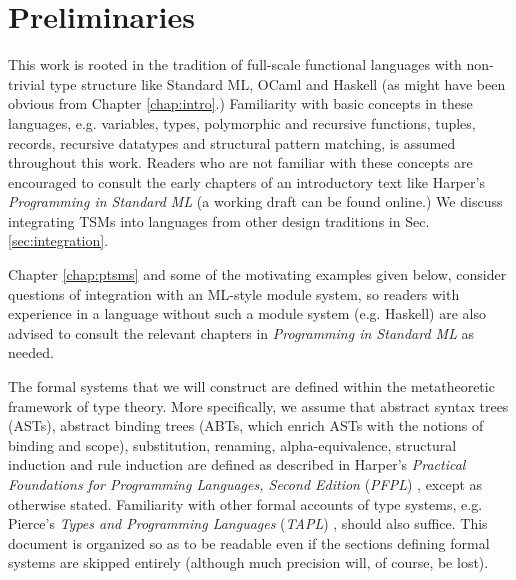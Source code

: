 
\section{Preliminaries}\label{sec:preliminaries}
This work is rooted in the tradition of full-scale functional languages with non-trivial type structure like Standard ML, OCaml and Haskell (as might have been obvious from Chapter \ref{chap:intro}.) Familiarity with basic concepts in these languages, e.g. variables, types, polymorphic and recursive functions, tuples, records, recursive datatypes and structural pattern matching, is assumed throughout this work. Readers who are not familiar with these concepts are encouraged to consult the early chapters of an introductory text like Harper's \emph{Programming in Standard ML} \cite{harper1997programming} (a working draft can be found online.) We discuss integrating TSMs into languages from other design traditions in Sec. \ref{sec:integration}.

Chapter \ref{chap:ptsms} and some of the motivating examples given below, consider questions of integration with an ML-style module system, so readers with experience in a language without such a module system (e.g. Haskell) are also advised to consult the relevant chapters in \emph{Programming in Standard ML} \cite{harper1997programming} as needed.

The formal systems that we will construct are defined within the metatheoretic framework of type theory. More specifically, we assume that abstract syntax trees (ASTs), abstract binding trees (ABTs, which enrich ASTs with the notions of binding and scope), substitution, renaming, alpha-equivalence, structural induction and rule induction are defined as described in Harper's \emph{Practical Foundations for Programming Languages, Second Edition} (\emph{PFPL}) \cite{pfpl}, except as otherwise stated. Familiarity with other formal accounts of type systems, e.g. Pierce's \emph{Types and Programming Languages} (\emph{TAPL}) \cite{tapl}, should also suffice. This document is organized so as to be readable even if the sections defining formal systems are skipped entirely (although much precision will, of course, be lost).

